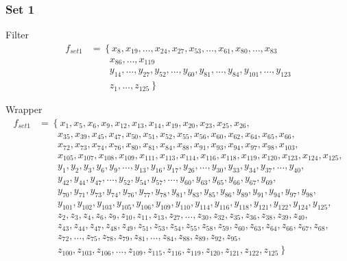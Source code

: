 \documentclass[USenglish]{ifimaster}  %
\begin{document}
\subsubsection{Set 1}
Filter
\begin{align}
f_{set1} &= \left\{x_{8}, x_{19},\dotsc, x_{24}, x_{27},  x_{53}, \dotsc, x_{61}, x_{80}, \dotsc, x_{83}\right.\nonumber\\
&\qquad \left.{}  x_{86},\dotsc,x_{119} \right.\nonumber\\
&\qquad \left.{}  y_{14},\dotsc,  y_{27}, y_{52}, \dotsc, y_{60}, y_{81},\dotsc, y_{84}, y_{101}, \dotsc, y_{123} \right.\nonumber\\
&\qquad \left.{} z_{1},\dotsc,z_{125} \right\}
\end{align}

Wrapper
\begin{align}
f_{set1} &= \left\{x_{1}, x_{5}, x_{6}, x_{9}, x_{12}, x_{13}, x_{14}, x_{19},x_{20},x_{23},x_{25},x_{26},  \right.\nonumber\\
&\qquad \left.{}  x_{35}, x_{39},x_{45},x_{47},x_{50},x_{51},x_{52},x_{55},x_{56},x_{60},x_{62},x_{64},x_{65},x_{66}, \right.\nonumber\\
&\qquad \left.{}  x_{72},x_{73},x_{74},x_{76},x_{80},x_{81},x_{84},x_{88},x_{91},x_{93},x_{94},x_{97},x_{98},x_{103}, \right.\nonumber\\
&\qquad \left.{}  x_{105},x_{107},x_{108},x_{109},x_{111},x_{113},x_{114},x_{116},x_{118},x_{119},x_{120},x_{123},x_{124},x_{125}, \right.\nonumber\\
&\qquad \left.{}  y_{1},y_{2},y_{3},y_{6},y_{9},\dotsc,y_{13},y_{16}, y_{17},y_{26},\dotsc,y_{30},y_{33}, y_{34},y_{37},\dotsc,y_{40}, \right.\nonumber\\
&\qquad \left.{}  y_{42}, y_{44}, y_{47},\dotsc, y_{52}, y_{54}, y_{57},\dotsc, y_{60}, y_{63}, y_{65}, y_{66}, y_{67}, y_{69}, \right.\nonumber\\
&\qquad \left.{}  y_{70}, y_{71}, y_{73}, y_{74}, y_{76}, y_{77}, y_{78}, y_{81}, y_{83}, y_{85}, y_{86}, y_{89}, y_{91}, y_{94}, y_{97}, y_{98}, \right.\nonumber\\
&\qquad \left.{}  y_{101}, y_{102}, y_{103}, y_{105}, y_{106}, y_{109}, y_{110}, y_{114}, y_{116}, y_{118}, y_{121}, y_{122}, y_{124}, y_{125}, \right.\nonumber\\
&\qquad \left.{}  z_{2}, z_{3}, z_{4}, z_{6}, z_{9}, z_{10}, z_{11}, z_{13},z_{27},\dotsc,z_{30},z_{32}, z_{35}, z_{36}, z_{38}, z_{39}, z_{40}, \right.\nonumber\\
&\qquad \left.{}  z_{43}, z_{44}, z_{47}, z_{48}, z_{49}, z_{51}, z_{53}, z_{54}, z_{55}, z_{58}, z_{59}, z_{60}, z_{63}, z_{64}, z_{66}, z_{67}, z_{68}, \right.\nonumber\\
&\qquad \left.{}  z_{72},\dotsc , z_{75}, z_{78}, z_{79}, z_{81},\dotsc, z_{84}, z_{88}, z_{89}, z_{92}, z_{95}, \right.\nonumber\\
&\qquad \left.{} z_{100}, z_{103}, z_{106},\dotsc ,z_{109}, z_{115}, z_{116}, z_{119}, z_{120}, z_{121}, z_{122}, z_{125}\right\}
\end{align}
\end{document}
